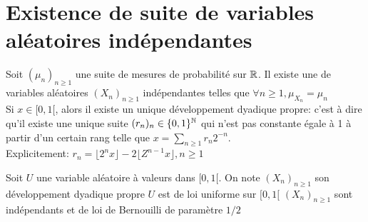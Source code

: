 \documentclass[]{report}
\begin{document}
    \section{Existence de suite de variables aléatoires indépendantes}

    \begin{tm}{}{}
        Soit $(\mu_n)_{n\ge 1}$ une suite de mesures de probabilité sur $\mathbb{R}$. Il existe une de variables aléatoires $(X_n)_{n\ge 1}$ indépendantes telles que $\forall n\ge 1, \mu_{X_n}=\mu_n$\\
        Si $x\in[0,1[$, alors il existe un unique développement dyadique propre: c'est à dire qu'il existe une unique suite $(r_n)_n\in\{0,1\}^{\mathbb{N}}$ qui n'est pas constante égale à 1 à partir d'un certain rang telle que $x=\sum_{n\ge 1}r_n 2^{-n}$.\\
        Explicitement: $r_n=\lfloor 2^nx\rfloor-2\lfloor Z^{n-1}x\rfloor,n\ge 1$
    \end{tm}

    \begin{lm}{}{}
        Soit $U$ une variable aléatoire à valeurs dans $[0,1[$. On note $(X_n)_{n\ge 1}$ son développement dyadique propre $U$ est de loi uniforme sur $[0,1[$ \ssi $(X_n)_{n\ge 1}$ sont indépendants et de loi de Bernouilli de paramètre $1/2$
    \end{lm}
\end{document}
